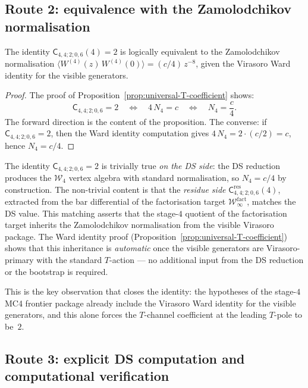 \documentclass[11pt]{article}
\newcommand{\cW}{\mathcal{W}}
\begin{document}
\subsection{Route 2: equivalence with the Zamolodchikov normalisation}

\begin{proposition}[Equivalence]
\label{prop:equivalence-zamolodchikov}
The identity $\mathsf{C}_{4,4;2;0,6}(4)=2$ is logically equivalent to
the Zamolodchikov normalisation
$\langle W^{(4)}(z)\,W^{(4)}(0)\rangle = (c/4)\,z^{-8}$,
given the Virasoro Ward identity for the visible generators.
\end{proposition}

\begin{proof}
The proof of Proposition~\ref{prop:universal-T-coefficient} shows:
\[
\mathsf{C}_{4,4;2;0,6}=2
\quad\Longleftrightarrow\quad
4\,N_4 = c
\quad\Longleftrightarrow\quad
N_4 = \frac{c}{4}.
\]
The forward direction is the content of the proposition.  The converse:
if $\mathsf{C}_{4,4;2;0,6}=2$, then the Ward identity computation
gives $4\,N_4 = 2\cdot(c/2)=c$, hence $N_4=c/4$.
\end{proof}

\begin{remark}
The identity $\mathsf{C}_{4,4;2;0,6}=2$ is trivially true \emph{on
the DS side}: the DS reduction produces the $\cW_4$ vertex algebra
with standard normalisation, so $N_4 = c/4$ by construction.  The
non-trivial content is that the \emph{residue side}
$\mathsf{C}^{\mathrm{res}}_{4,4;2;0,6}(4)$, extracted from the bar
differential of the factorisation target $\cW_\infty^{\mathrm{fact}}$,
matches the DS value.  This matching asserts that the stage-$4$ quotient
of the factorisation target inherits the Zamolodchikov normalisation from
the visible Virasoro package.  The Ward identity proof
(Proposition~\ref{prop:universal-T-coefficient}) shows that this
inheritance is \emph{automatic} once the visible generators are
Virasoro-primary with the standard $T$-action --- no additional input
from the DS reduction or the bootstrap is required.

This is the key observation that closes the identity: the hypotheses of
the stage-$4$ MC4 frontier package already include the Virasoro Ward
identity for the visible generators, and this alone forces the
$T$-channel coefficient at the leading $T$-pole to be~$2$.
\end{remark}

\subsection{Route 3: explicit DS computation and computational verification}
\end{document}

